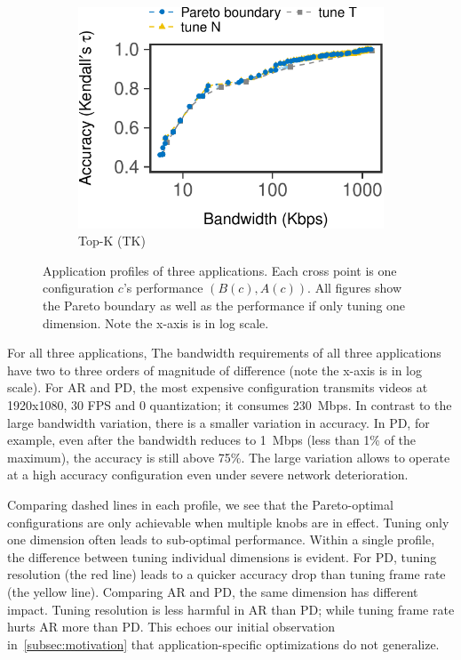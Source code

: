 \begin{figure}
\begin{subfigure}[t]{0.45\textwidth}
    \centering
    \includegraphics[width=\textwidth]{figures/profile-topk.pdf}
    \caption{Top-K (TK)}
    \label{fig:tk-profile}
  \end{subfigure}
  \caption{Application profiles of three applications. Each cross point is one
    configuration $c$'s performance $(B(c), A(c))$. All figures show the Pareto
    boundary as well as the performance if only tuning one dimension. Note the
    x-axis is in log scale.}
  \label{fig:all-profiles}
\end{figure}

 For all three applications, The bandwidth
requirements of all three applications have two to three orders of magnitude of
difference (note the x-axis is in log scale). For AR and PD, the most expensive
configuration transmits videos at 1920x1080, 30 FPS and 0 quantization; it
consumes \SI{230}{Mbps}. In contrast to the large bandwidth variation, there is
a smaller variation in accuracy. In PD, for example, even after the bandwidth
reduces to \SI{1}{Mbps} (less than 1\% of the maximum), the accuracy is still
above 75\%. The large variation allows \awstream{} to operate at a high accuracy
configuration even under severe network deterioration.

 Comparing dashed lines in each
profile, we see that the Pareto-optimal configurations are only achievable when
multiple knobs are in effect. Tuning only one dimension often leads to
sub-optimal performance. Within a single profile, the difference between tuning
individual dimensions is evident. For PD, tuning resolution (the red line) leads
to a quicker accuracy drop than tuning frame rate (the yellow line). Comparing
AR and PD, the same dimension has different impact. Tuning resolution is less
harmful in AR than PD; while tuning frame rate hurts AR more than PD\@. This
echoes our initial observation in~\autoref{subsec:motivation} that
application-specific optimizations do not generalize.

